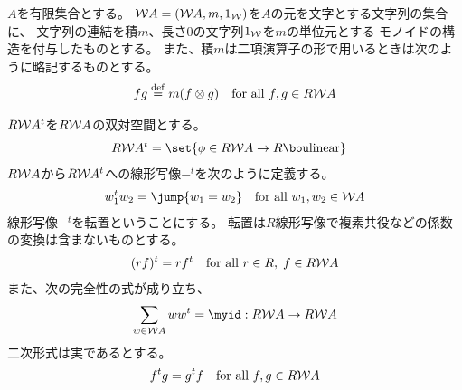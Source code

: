 	$A$を有限集合とする。
	$\mathcal{W}{A}=(\mathcal{W}{A},m,1_{\mathcal{W}{}})$を$A$の元を文字とする文字列の集合に、
	文字列の連結を積$m$、長さ$0$の文字列$1_{\mathcal{W}{}}$を$m$の単位元とする
	モノイドの構造を付与したものとする。
	また、積$m$は二項演算子の形で用いるときは次のように略記するものとする。
	\begin{equation*}\begin{split} %
		fg \mydef m(f\otimes g)
		\quad\text{for all }f,g\in R\Word{A}
	\end{split}\end{equation*} %

	$R\mathcal{W}{A}^t$を$R\mathcal{W}{A}$の双対空間とする。
	\begin{equation*}\begin{split} %
		R\Word{A}^t &= \set{\phi\in R\Word{A}\to R\bou \text{linear}}
	\end{split}\end{equation*} %
	$R\mathcal{W}{A}$から$R\mathcal{W}{A}^t$への線形写像$-^t$を次のように定義する。
	\begin{equation*}\begin{split} %
		w_1^tw_2 = \jump{w_1=w_2}
		\quad\text{for all }w_1,w_2\in \Word{A}
	\end{split}\end{equation*} %
	線形写像$-^t$を転置ということにする。
	転置は$R$線形写像で複素共役などの係数の変換は含まないものとする。
	\begin{equation*}\begin{split} %
		(rf)^t = rf^t \quad\text{for all }r\in R,\;f\in R\Word{A}
	\end{split}\end{equation*} %
	また、次の完全性の式が成り立ち、
	\begin{equation}\label{eq:基底の完全性}\begin{split} %
		\sum_{w\in\Word{A}}ww^t = \myid:R\Word{A}\to R\Word{A} \\
	\end{split}\end{equation} %
	二次形式は実であるとする。
	\begin{equation}\label{eq:転置の実性}\begin{split} %
		f^tg = g^tf \quad\text{for all }f,g\in R\Word{A}
	\end{split}\end{equation} %

